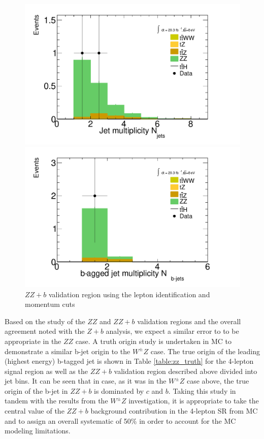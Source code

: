 \begin{figure}[htbp]
  \begin{minipage}[h]{0.5\textwidth}
    \centering \includegraphics[width=\textwidth]{figs/WZ/zz_b_NJet}
  \end{minipage}\hfill
  \begin{minipage}[h]{0.5\textwidth}
    \centering \includegraphics[width=\textwidth]{figs/WZ/zz_b_NJetBTag}
  \end{minipage}\hfill
        \caption{$ZZ+b$ validation region using the \tth lepton identification and momentum cuts }
        \label{figure:background_zz_z_b}
\end{figure}
 
Based on the study of the $ZZ$ and $ZZ+b$ validation regions and the overall agreement noted with the $Z+b$ analysis, we expect a similar error to \WZ to be appropriate in the $ZZ$ case.  A truth origin study is undertaken in MC to demonstrate a similar b-jet origin to the $W^{\pm}Z$ case. The true origin of the leading (highest energy) b-tagged jet is shown in Table \ref{table:zz_truth} for the 4-lepton signal region as well as the $ZZ+b$ validation region described above divided into jet bins. It can be seen that in case, as it was in the $W^{\pm}Z$ case above, the true origin of the b-jet in $ZZ+b$ is dominated by $c$ and $b$. Taking this study in tandem with the results from the $W^{\pm}Z$ investigation, it is appropriate to take the central value of the $ZZ+b$ background contribution in the 4-lepton SR from MC and to assign an overall systematic of 50\% in order to account for the MC modeling limitations. 

